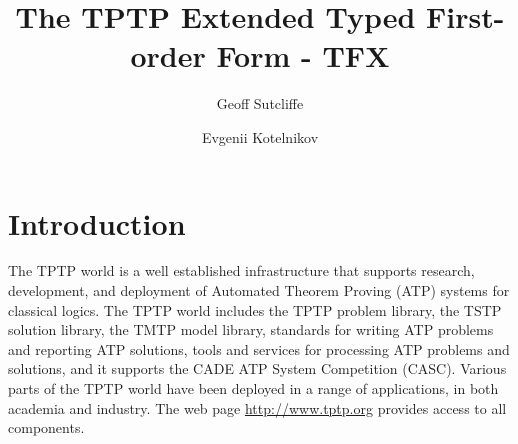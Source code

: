 \documentclass{easychair}
\begin{document}
\title{The TPTP Extended Typed First-order Form - TFX}
\author{
    Geoff Sutcliffe
\and
    Evgenii Kotelnikov
}
\clearpage
\maketitle

\begin{abstract}
\end{abstract}

\newcommand{\binding}[2]{{#1}={#2}}
\newcommand{\ite}[3]{\mathtt{if}\;{#1}\;\allowbreak\mathtt{then}\;{#2}\;\allowbreak\mathtt{else}\;{#3}}
\newcommand{\letin}[3]{\mathtt{let}\;\binding{#1}{#2}\;\allowbreak\mathtt{in}\;{#3}}
\newcommand{\letindef}[2]{\mathtt{let}\;{#1}\;\allowbreak\mathtt{in}\;{#2}}
\newcommand{\letnl}[3]{\begin{aligned}[t]\mathtt{let}\;&\binding{#1}{#2}\\[-0.2em]\mathtt{in}\;&{#3}\end{aligned}}
\newcommand{\letinnl}[3]{\begin{aligned}[t]&\mathtt{let}\;\binding{#1}{#2}\;\mathtt{in}\\[-0.2em]&\quad{#3}\end{aligned}}
\newcommand{\itenll}[3]{\begin{aligned}[t]&\mathtt{if}\;{#1}\\[-0.2em]&\mathtt{then}\;{#2}\\[-0.2em]&\mathtt{else}\;{#3}\end{aligned}}

\renewcommand{\implies}{\Rightarrow}
\newcommand{\liff}{\Leftrightarrow}
\newcommand{\lniff}{\not\Leftrightarrow}
\newcommand{\eql}{\doteq}
\newcommand{\neql}{\not\doteq}
\newcommand{\bool}{\mathit{bool}}

\section{Introduction}
\label{Introduction}

The TPTP world \cite{Sut10} is a well established infrastructure that supports
research, development, and deployment of Automated Theorem Proving (ATP)
systems for classical logics.
The TPTP world includes the TPTP problem library,
the TSTP solution library,
the TMTP model library,
standards for writing ATP problems and reporting ATP solutions,
tools and services for processing ATP problems and solutions,
and it supports the CADE ATP System Competition (CASC).
Various parts of the TPTP world have been deployed in a range of applications,
in both academia and industry.
The web page \url{http://www.tptp.org} provides access to all components.
\end{document}
